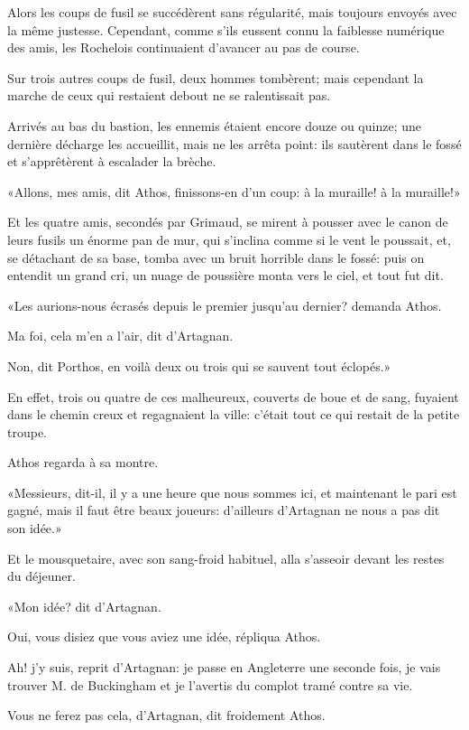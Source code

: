 Alors les coups de fusil se succédèrent sans régularité, mais toujours envoyés avec la même justesse. Cependant, comme s'ils eussent connu la faiblesse numérique des amis, les Rochelois continuaient d'avancer au pas de course. 

Sur trois autres coups de fusil, deux hommes tombèrent; mais cependant la marche de ceux qui restaient debout ne se ralentissait pas. 

Arrivés au bas du bastion, les ennemis étaient encore douze ou quinze; une dernière décharge les accueillit, mais ne les arrêta point: ils sautèrent dans le fossé et s'apprêtèrent à escalader la brèche. 

«Allons, mes amis, dit Athos, finissons-en d'un coup: à la muraille! à la muraille!» 

Et les quatre amis, secondés par Grimaud, se mirent à pousser avec le canon de leurs fusils un énorme pan de mur, qui s'inclina comme si le vent le poussait, et, se détachant de sa base, tomba avec un bruit horrible dans le fossé: puis on entendit un grand cri, un nuage de poussière monta vers le ciel, et tout fut dit. 

«Les aurions-nous écrasés depuis le premier jusqu'au dernier? demanda Athos. 

\speak  Ma foi, cela m'en a l'air, dit d'Artagnan. 

\speak  Non, dit Porthos, en voilà deux ou trois qui se sauvent tout éclopés.» 

En effet, trois ou quatre de ces malheureux, couverts de boue et de sang, fuyaient dans le chemin creux et regagnaient la ville: c'était tout ce qui restait de la petite troupe. 

Athos regarda à sa montre. 

«Messieurs, dit-il, il y a une heure que nous sommes ici, et maintenant le pari est gagné, mais il faut être beaux joueurs: d'ailleurs d'Artagnan ne nous a pas dit son idée.» 

Et le mousquetaire, avec son sang-froid habituel, alla s'asseoir devant les restes du déjeuner. 

«Mon idée? dit d'Artagnan. 

\speak  Oui, vous disiez que vous aviez une idée, répliqua Athos. 

\speak  Ah! j'y suis, reprit d'Artagnan: je passe en Angleterre une seconde fois, je vais trouver M. de Buckingham et je l'avertis du complot tramé contre sa vie. 

\speak  Vous ne ferez pas cela, d'Artagnan, dit froidement Athos. 

